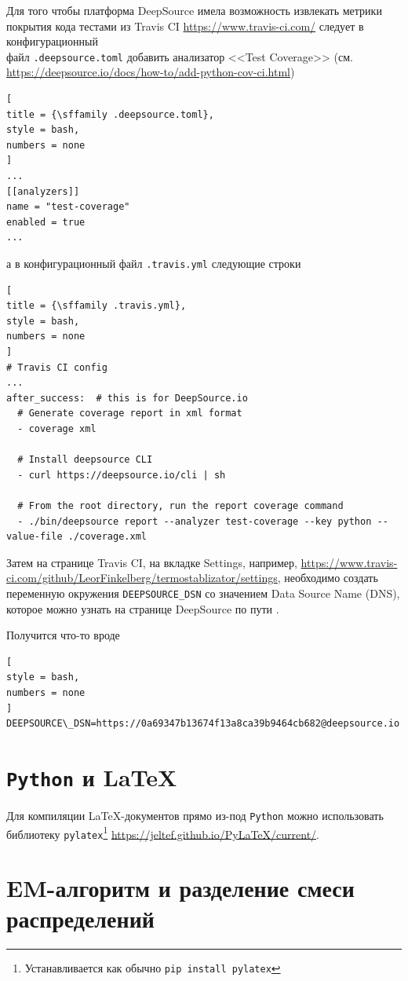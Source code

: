 \documentclass[%
	11pt,
	a4paper,
	utf8,
		]{article}
\begin{document}
Для того чтобы платформа DeepSource имела возможность извлекать метрики покрытия кода тестами из Travis CI \url{https://www.travis-ci.com/} следует в конфигурационный \\файл \texttt{.deepsource.toml} добавить анализатор <<Test Coverage>> (см. \url{https://deepsource.io/docs/how-to/add-python-cov-ci.html})
\begin{lstlisting}[
title = {\sffamily .deepsource.toml},
style = bash,
numbers = none	
]
...
[[analyzers]]
name = "test-coverage"
enabled = true
...
\end{lstlisting}
а в конфигурационный файл \texttt{.travis.yml} следующие строки
\begin{lstlisting}[
title = {\sffamily .travis.yml},
style = bash,
numbers = none	
]
# Travis CI config
...
after_success:  # this is for DeepSource.io
  # Generate coverage report in xml format
  - coverage xml

  # Install deepsource CLI
  - curl https://deepsource.io/cli | sh

  # From the root directory, run the report coverage command
  - ./bin/deepsource report --analyzer test-coverage --key python --value-file ./coverage.xml
\end{lstlisting}

Затем на странице Travis CI, на вкладке Settings, например, \url{https://www.travis-ci.com/github/LeorFinkelberg/termostablizator/settings}, необходимо создать переменную окружения \texttt{DEEPSOURCE\_DSN} со значением Data Source Name (DNS), которое можно узнать на странице DeepSource по пути .

Получится что-то вроде
\begin{lstlisting}[
style = bash,
numbers = none
]
DEEPSOURCE\_DSN=https://0a69347b13674f13a8ca39b9464cb682@deepsource.io
\end{lstlisting}




\section{\texttt{Python} и \LaTeX}

Для компиляции \LaTeX-документов прямо из-под \texttt{Python} можно использовать библиотеку \texttt{pylatex}\footnote{Устанавливается как обычно \texttt{pip install pylatex}} \url{https://jeltef.github.io/PyLaTeX/current/}.

\section{EM-алгоритм и разделение смеси распределений}
\end{document}
